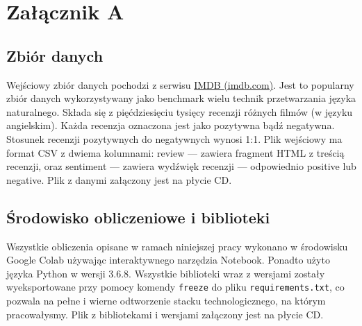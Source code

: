 \chapter*{Załącznik A}
\label{appendix}

\section*{Zbiór danych}

Wejściowy zbiór danych pochodzi z serwisu \href{https://ai.stanford.edu/~amaas/data/sentiment/}{IMDB (imdb.com)}. Jest to popularny zbiór danych wykorzystywany jako benchmark wielu technik przetwarzania języka naturalnego. Składa się z pięćdziesięciu tysięcy recenzji różnych filmów (w języku angielskim). Każda recenzja oznaczona jest jako pozytywna bądź negatywna. Stosunek recenzji pozytywnych do negatywnych wynosi 1:1. Plik wejściowy ma format CSV z dwiema kolumnami: review --- zawiera fragment HTML z treścią recenzji, oraz sentiment --- zawiera wydźwięk recenzji --- odpowiednio positive lub negative. Plik z danymi załączony jest na płycie CD.


\section*{Środowisko obliczeniowe i biblioteki}
Wszystkie obliczenia opisane w ramach niniejszej pracy wykonano w środowisku Google Colab używając interaktywnego narzędzia Notebook. Ponadto użyto języka Python w wersji 3.6.8.
\noindent Wszystkie biblioteki wraz z wersjami zostały wyeksportowane przy pomocy komendy \verb|freeze| do pliku \verb|requirements.txt|, co pozwala na pełne i wierne odtworzenie stacku technologicznego, na którym pracowałysmy. Plik z bibliotekami i wersjami załączony jest na płycie CD.


